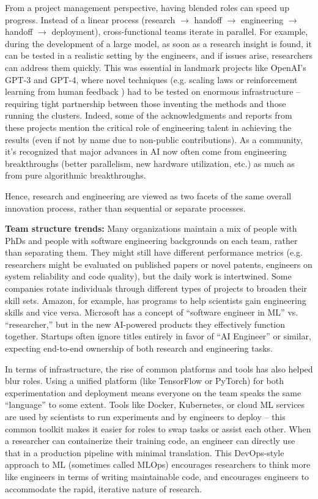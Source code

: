 \documentclass[pdflatex,sn-mathphys-num]{sn-jnl}%
\theoremstyle{thmstyleone}%
\theoremstyle{thmstyletwo}%
\theoremstyle{thmstylethree}%
\begin{document}
From a project management perspective, having blended roles can speed up progress. Instead of a linear process (research $\rightarrow$ handoff $\rightarrow$ engineering $\rightarrow$ handoff $\rightarrow$ deployment), cross-functional teams iterate in parallel. For example, during the development of a large model, as soon as a research insight is found, it can be tested in a realistic setting by the engineers, and if issues arise, researchers can address them quickly. This was essential in landmark projects like OpenAI’s GPT-3 and GPT-4, where novel techniques (e.g. scaling laws \citep{kaplan2020scaling,hoffmann2022chinchilla} or reinforcement learning from human feedback \citep{christiano2017prefs,ouyang2022instructgpt}) had to be tested on enormous infrastructure – requiring tight partnership between those inventing the methods and those running the clusters. Indeed, some of the acknowledgments and reports from these projects mention the critical role of engineering talent in achieving the results (even if not by name due to non-public contributions). As a community, it’s recognized that major advances in AI now often come from engineering breakthroughs (better parallelism, new hardware utilization, etc.) as much as from pure algorithmic breakthroughs.

Hence, research and engineering are viewed as two facets of the same overall innovation process, rather than sequential or separate processes.

\textbf{Team structure trends:} Many organizations maintain a mix of people with PhDs and people with software engineering backgrounds on each team, rather than separating them. They might still have different performance metrics (e.g. researchers might be evaluated on published papers or novel patents, engineers on system reliability and code quality), but the daily work is intertwined. Some companies rotate individuals through different types of projects to broaden their skill sets. Amazon, for example, has programs to help scientists gain engineering skills and vice versa. Microsoft has a concept of “software engineer in ML” vs. “researcher,” but in the new AI-powered products they effectively function together. Startups often ignore titles entirely in favor of “AI Engineer” or similar, expecting end-to-end ownership of both research and engineering tasks.

In terms of infrastructure, the rise of common platforms and tools has also helped blur roles. Using a unified platform (like TensorFlow or PyTorch) for both experimentation and deployment means everyone on the team speaks the same “language” to some extent. Tools like Docker, Kubernetes, or cloud ML services are used by scientists to run experiments and by engineers to deploy – this common toolkit makes it easier for roles to swap tasks or assist each other. When a researcher can containerize their training code, an engineer can directly use that in a production pipeline with minimal translation. This DevOps-style approach to ML (sometimes called MLOps) encourages researchers to think more like engineers in terms of writing maintainable code, and encourages engineers to accommodate the rapid, iterative nature of research.
\end{document}
